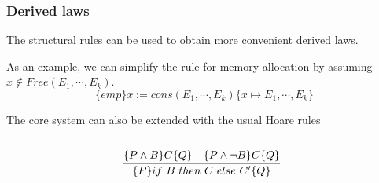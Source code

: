 \documentclass{beamer}
\begin{document}
    \begin{frame}
        \frametitle{Derived laws}
        The structural rules can be used to obtain more convenient derived laws.
        
        As an example, we can simplify the rule for memory allocation by assuming $x \notin Free(E_1,\cdots,E_k)$.
        $$
        \{emp\}x:=cons(E_1,\cdots, E_k)\{x \mapsto E_1,\cdots,E_k\}
        $$
        \pause

        \bigskip

        The core system can also be extended with the usual Hoare rules
        \begin{columns}
            \begin{column}{.5\textwidth}
                $$
                \infer[]{\{P\}if\ B\ then\ C\ else\ C'\{Q\}}{\{P \wedge B \}C\{Q\} \quad  \{P \wedge \neg B\}C\{Q\}}
                $$
            \end{column}
        \end{columns}
    \end{frame}
\end{document}
